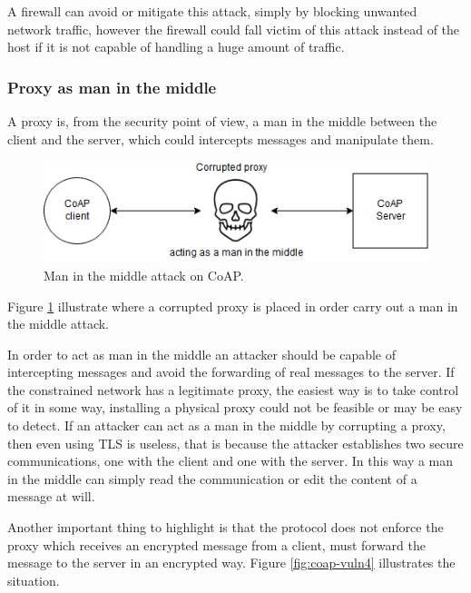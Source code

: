 	A firewall can avoid or mitigate this attack, simply by blocking unwanted network traffic, however the firewall could fall victim of this attack instead of the host if it is not capable of handling a huge amount of traffic.\newline
	
	\subsubsection{Proxy as man in the middle}
	A proxy is, from the security point of view, a man in the middle between the client and the server, which could intercepts messages and manipulate them.
	
	\begin{figure}
		\includegraphics[width=\linewidth]{coap-vuln-img3.png}
		\caption{Man in the middle attack on CoAP.}
		\label{fig:coap-vuln3}
	\end{figure}
	
	Figure \ref{fig:coap-vuln3} illustrate where a corrupted proxy is placed in order carry out a man in the middle attack.\newline
	
	In order to act as man in the middle an attacker should be capable of intercepting messages and avoid the forwarding of real messages to the server.\newline
	If the constrained network has a legitimate proxy, the easiest way is to take control of it in some way, installing a physical proxy could not be feasible or may be easy to detect.\newline
	If an attacker can act as a man in the middle by corrupting a proxy, then even using TLS is useless, that is because the attacker establishes two secure communications, one with the client and one with the server.\newline
	In this way a man in the middle can simply read the communication or edit the content of a message at will.\newline
	
	Another important thing to highlight is that the protocol does not enforce the proxy which receives an encrypted message from a client, must forward the message to the server in an encrypted way.
	Figure \ref{fig:coap-vuln4} illustrates the situation.\newline
	
